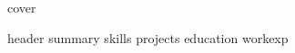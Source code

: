 \documentclass[10pt, letterpaper]{article}
\begin{document}
    {cover}

	{header}    
	{summary}
    {skills}
	{projects}
    {education}
    {workexp}
\end{document}
